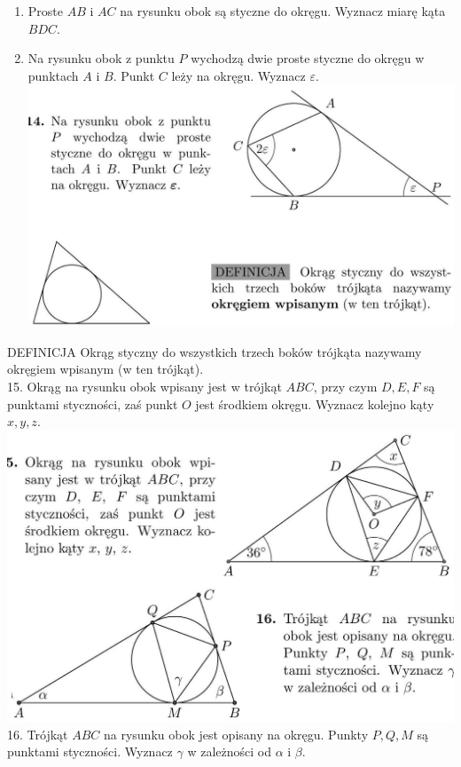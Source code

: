 \documentclass[10pt]{article}
\begin{document}
\begin{enumerate}
  \item Proste \(A B\) i \(A C\) na rysunku obok są styczne do okręgu. Wyznacz miarę kąta \(B D C\).
  \item Na rysunku obok z punktu \(P\) wychodzą dwie proste styczne do okręgu w punktach \(A\) i \(B\). Punkt \(C\) leży na okręgu. Wyznacz \(\varepsilon\).\\
\includegraphics[max width=\textwidth, center]{2024_11_21_e9b4faa005d5be2cc318g-034(1)}
\end{enumerate}

DEFINICJA Okrąg styczny do wszystkich trzech boków trójkąta nazywamy okręgiem wpisanym (w ten trójkąt).\\
15. Okrąg na rysunku obok wpisany jest w trójkąt \(A B C\), przy czym \(D, E, F\) są punktami styczności, zaś punkt \(O\) jest środkiem okręgu. Wyznacz kolejno kąty \(x, y, z\).\\
\includegraphics[max width=\textwidth, center]{2024_11_21_e9b4faa005d5be2cc318g-034(2)}\\
16. Trójkąt \(A B C\) na rysunku obok jest opisany na okręgu. Punkty \(P, Q, M\) są punktami styczności. Wyznacz \(\gamma\) w zależności od \(\alpha\) i \(\beta\).
\end{document}
